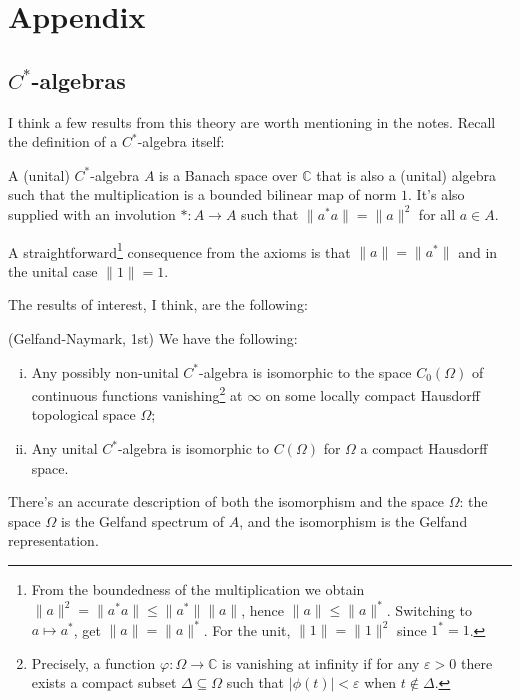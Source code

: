 \section{Appendix}
\subsection{$C^*$-algebras}
I think a few results from this theory are worth mentioning in the notes. Recall the definition of a $C^*$-algebra itself:
\begin{definition}
A (unital) $C^*$-algebra $A$ is a Banach space over $\mathbb C$ that is also a (unital) algebra such that the multiplication is a bounded bilinear map of norm $1$. It's also supplied with an involution $*:A\rightarrow A$ such that $\|a^*a\| = \|a\|^2$ for all $a \in A$. 
\end{definition}
A straightforward\footnote{From the boundedness of the multiplication we obtain $\|a\|^2 = \|a^*a\| \leq \|a^*\|\|a\|$, hence $\|a\| \leq \|a\|^*$. Switching to $a \mapsto a^*$, get $\|a\| = \|a\|^*$. For the unit, $\|1\| = \|1\|^2$ since $1^* = 1$.} consequence from the axioms is that $\|a\| = \|a^*\|$ and in the unital case $\|1\| = 1$.

The results of interest, I think, are the following:
\begin{theorem}
(Gelfand-Naymark, 1st) We have the following:
\begin{enumerate}[(i)]
\item Any possibly non-unital $C^*$-algebra is isomorphic to the space $C_0(\Omega)$ of continuous functions vanishing\footnote{Precisely, a function $\varphi : \Omega \rightarrow \mathbb C$ is vanishing at infinity if for any $\varepsilon >0$ there exists a compact subset $\Delta \subseteq \Omega$ such that $|\phi(t)|< \varepsilon$ when $t \notin \Delta$.} at $\infty$ on some locally compact Hausdorff topological space $\Omega$;
\item Any unital $C^*$-algebra is isomorphic to $C(\Omega)$ for $\Omega$ a compact Hausdorff space.
\end{enumerate}
\end{theorem}

There's an accurate description of both the isomorphism and the space $\Omega$: the space $\Omega$ is the Gelfand spectrum of $A$, and the isomorphism is the Gelfand representation.

